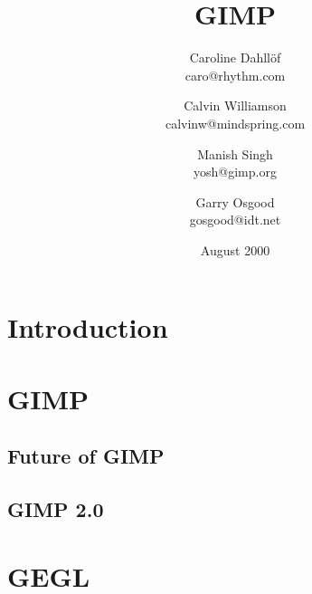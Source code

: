 \documentclass{report}
\begin{document}
\begin{titlepage}
\title{\huge GIMP}
\author{Caroline Dahll\"{o}f\\
caro@rhythm.com 
\and Calvin Williamson\\
calvinw@mindspring.com
\and Manish Singh\\
yosh@gimp.org
\and Garry Osgood\\
gosgood@idt.net}
\date{August 2000}
\maketitle
\end{titlepage}
\tableofcontents


% 
%


\chapter{Introduction}


\chapter{GIMP}
\section{Future of GIMP} 

\section{GIMP 2.0}



\chapter{GEGL}

\end{document}
